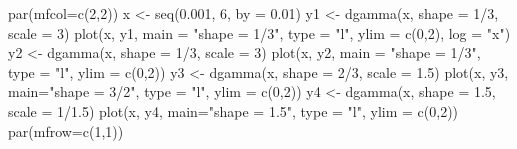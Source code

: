 \begin{Schunk}
\begin{Sinput}
 par(mfcol=c(2,2))
 x <- seq(0.001, 6, by = 0.01)
 y1 <- dgamma(x, shape = 1/3, scale = 3)
 plot(x, y1, main = "shape = 1/3", type = "l", ylim = c(0,2), log = "x")
 y2 <- dgamma(x, shape = 1/3, scale = 3)
 plot(x, y2, main = "shape = 1/3", type = "l", ylim = c(0,2))
 y3 <- dgamma(x, shape = 2/3, scale = 1.5)
 plot(x, y3, main="shape = 3/2", type = "l", ylim = c(0,2))
 y4 <- dgamma(x, shape = 1.5, scale = 1/1.5)
 plot(x, y4, main="shape = 1.5", type = "l", ylim = c(0,2))
 par(mfrow=c(1,1))
\end{Sinput}
\end{Schunk}
